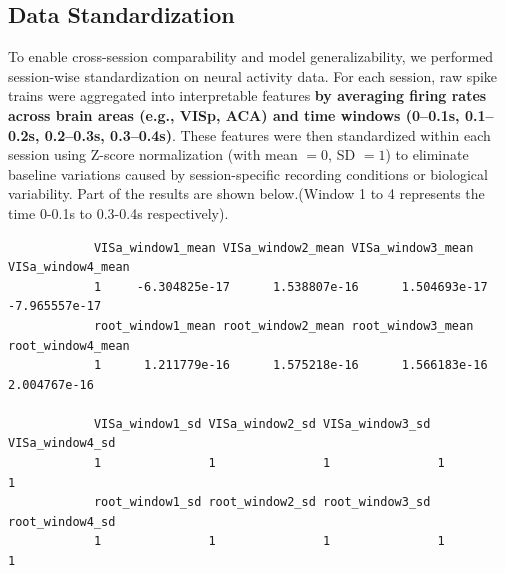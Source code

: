 \documentclass{article}
\begin{document}
	\subsection{Data Standardization}
	\par To enable cross-session comparability and model generalizability, we performed session-wise standardization on neural activity data. For each session, raw spike trains were aggregated into interpretable features \textbf{by averaging firing rates across brain areas (e.g., VISp, ACA) and time windows (0–0.1s, 0.1–0.2s, 0.2–0.3s, 0.3–0.4s)}. These features were then standardized within each session using Z-score normalization (with mean $= 0$, SD $= 1$) to eliminate baseline variations caused by session-specific recording conditions or biological variability. Part of the results are shown below.(Window 1 to 4 represents the time 0-0.1s to 0.3-0.4s respectively).
	\begin{framed}
		\begin{verbatim}
			VISa_window1_mean VISa_window2_mean VISa_window3_mean VISa_window4_mean
			1     -6.304825e-17      1.538807e-16      1.504693e-17     -7.965557e-17
			root_window1_mean root_window2_mean root_window3_mean root_window4_mean
			1      1.211779e-16      1.575218e-16      1.566183e-16      2.004767e-16
			
			VISa_window1_sd VISa_window2_sd VISa_window3_sd VISa_window4_sd
			1               1               1               1               1
			root_window1_sd root_window2_sd root_window3_sd root_window4_sd
			1               1               1               1               1
		\end{verbatim}
	\end{framed}
\end{document}
